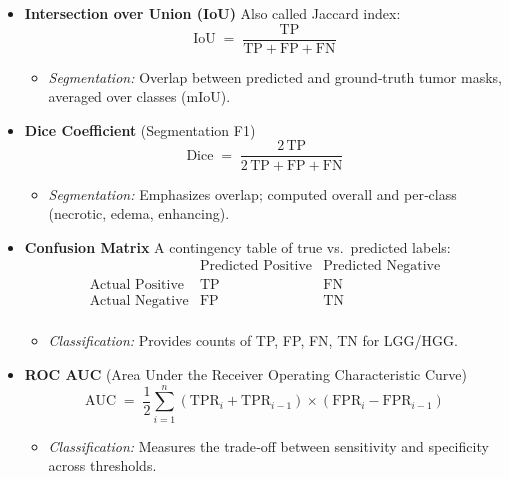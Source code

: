 \begin{itemize}
  \item \textbf{Intersection over Union (IoU)}
        Also called Jaccard index:
        \[
          \text{IoU} \;=\; \frac{\text{TP}}{\text{TP} + \text{FP} + \text{FN}}
        \]
        \begin{itemize}
          \item \emph{Segmentation:} Overlap between predicted and ground‐truth tumor masks, averaged over classes (mIoU).
        \end{itemize}

  \item \textbf{Dice Coefficient} (Segmentation F1)
        \[
          \text{Dice} \;=\; \frac{2\,\text{TP}}{2\,\text{TP} + \text{FP} + \text{FN}}
        \]
        \begin{itemize}
          \item \emph{Segmentation:} Emphasizes overlap; computed overall and per‐class (necrotic, edema, enhancing).
        \end{itemize}

  \item \textbf{Confusion Matrix}
        A contingency table of true vs.\ predicted labels:
        \[
          \begin{array}{c|cc}
                                   & \text{Predicted Positive} & \text{Predicted Negative} \\ \hline
            \text{Actual Positive} & \text{TP}                 & \text{FN}                 \\
            \text{Actual Negative} & \text{FP}                 & \text{TN}                 \\
          \end{array}
        \]
        \begin{itemize}
          \item \emph{Classification:} Provides counts of TP, FP, FN, TN for LGG/HGG.
        \end{itemize}

  \item \textbf{ROC AUC} (Area Under the Receiver Operating Characteristic Curve)
        \[
          \text{AUC} \;=\; \frac{1}{2} \sum_{i=1}^{n} (\text{TPR}_{i} + \text{TPR}_{i-1}) \times (\text{FPR}_{i} - \text{FPR}_{i-1})
        \]

        \begin{itemize}
          \item \emph{Classification:} Measures the trade‐off between sensitivity and specificity across thresholds.
        \end{itemize}

\end{itemize}
